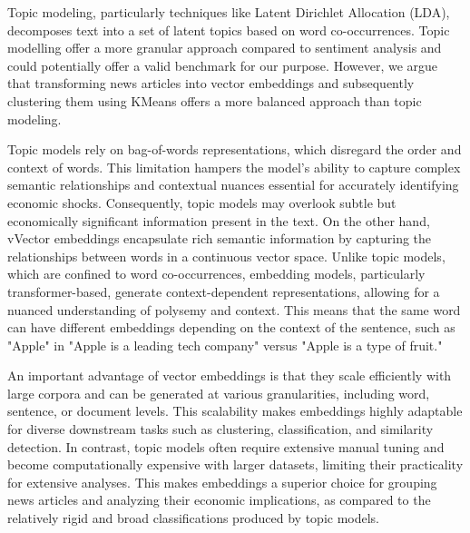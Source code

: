 \hspace{0.5cm} Topic modeling, particularly techniques like Latent Dirichlet Allocation (LDA), decomposes text into a set of latent topics based on word co-occurrences. Topic modelling  offer a more granular approach compared to sentiment analysis and could potentially offer a valid benchmark for our purpose. However, we argue that transforming news articles into vector embeddings and subsequently clustering them using KMeans offers a more balanced approach than topic modeling.

Topic models rely on bag-of-words representations, which disregard the order and context of words. This limitation hampers the model's ability to capture complex semantic relationships and contextual nuances essential for accurately identifying economic shocks. Consequently, topic models may overlook subtle but economically significant information present in the text. On the other hand, vVector embeddings encapsulate rich semantic information by capturing the relationships between words in a continuous vector space. Unlike topic models, which are confined to word co-occurrences, embedding models, particularly transformer-based, generate context-dependent representations, allowing for a nuanced understanding of polysemy and context. This means that the same word can have different embeddings depending on the context of the sentence, such as "Apple" in "Apple is a leading tech company" versus "Apple is a type of fruit." 


An important advantage of vector embeddings is that they scale efficiently with large corpora and can be generated at various granularities, including word, sentence, or document levels. This scalability makes embeddings highly adaptable for diverse downstream tasks such as clustering, classification, and similarity detection. In contrast, topic models often require extensive manual tuning and become computationally expensive with larger datasets, limiting their practicality for extensive analyses. This makes embeddings a superior choice for grouping news articles and analyzing their economic implications, as compared to the relatively rigid and broad classifications produced by topic models.

